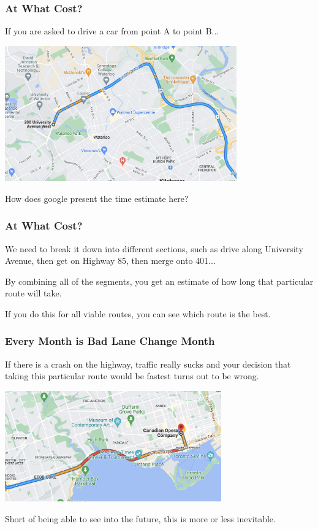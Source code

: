 \begin{frame}
\frametitle{At What Cost?}

If you are asked to drive a car from point A to point B...

\begin{center}
	\includegraphics[width=0.75\textwidth]{images/optimize-map.png}
\end{center}

How does google present the time estimate here?

\end{frame}

\begin{frame}
\frametitle{At What Cost?}

We need to break it down into different sections, such as drive along University Avenue, then get on Highway 85, then merge onto 401... 

By combining all of the segments, you get an estimate of how long that particular route will take. 

If you do this for all viable routes, you can see which route is the best. 

\end{frame}

\begin{frame}
\frametitle{Every Month is Bad Lane Change Month}

If there is a crash on the highway, traffic really sucks and your decision that taking this particular route would be fastest turns out to be wrong. 

\begin{center}
	\includegraphics[width=0.7\textwidth]{images/map-traffic.png}
\end{center}

Short of being able to see into the future, this is more or less inevitable.

\end{frame}

